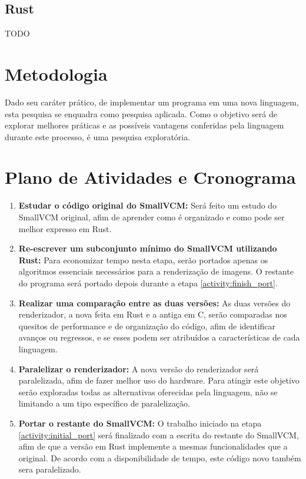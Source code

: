 \documentclass[12pt]{article}
\def\Cpp{{C\nolinebreak[4]\raisebox{.20ex}{\small\bf++}}}
\newcommand{\todo}[1]{\textsf{\color{red}#1}}
\begin{document}
\subsection{Rust}

\todo{TODO}

\section{Metodologia}

Dado seu caráter prático, de implementar um programa em uma nova linguagem, esta pesquisa se
enquadra como pesquisa aplicada. Como o objetivo será de explorar melhores práticas e as possíveis
vantagens conferidas pela linguagem durante este processo, é uma pesquisa exploratória.

\section{Plano de Atividades e Cronograma}

\begin{enumerate}
	\item \label{activity:study} \textbf{Estudar o código original do SmallVCM:}
		Será feito um estudo do SmallVCM original, afim de aprender como é organizado e como pode
		ser melhor expresso em Rust.
	\item \label{activity:initial_port} \textbf{Re-escrever um subconjunto mínimo do SmallVCM utilizando Rust:}
		Para economizar tempo nesta etapa, serão portados apenas os algoritmos essenciais
		necessários para a renderização de imagens. O restante do programa será portado depois
		durante a etapa \ref{activity:finish_port}.
	\item \label{activity:compare} \textbf{Realizar uma comparação entre as duas versões:}
		As duas versões do renderizador, a nova feita em Rust e a antiga em \Cpp, serão comparadas
		nos quesitos de performance e de organização do código, afim de identificar avanços ou
		regressos, e se esses podem ser atribuídos a características de cada linguagem.
	\item \label{activity:parallelize} \textbf{Paralelizar o renderizador:}
		A nova versão do renderizador será paralelizada, afim de fazer melhor uso do hardware. Para
		atingir este objetivo serão exploradas todas as alternativas oferecidas pela linguagem, não
		se limitando a um tipo específico de paralelização.
	\item \label{activity:finish_port} \textbf{Portar o restante do SmallVCM:}
		O trabalho iniciado na etapa \ref{activity:initial_port} será finalizado com a escrita do
		restante do SmallVCM, afim de que a versão em Rust implemente a mesmas funcionalidades que a
		original. De acordo com a disponibilidade de tempo, este código novo também sera
		paralelizado.
\end{enumerate}
\end{document}
